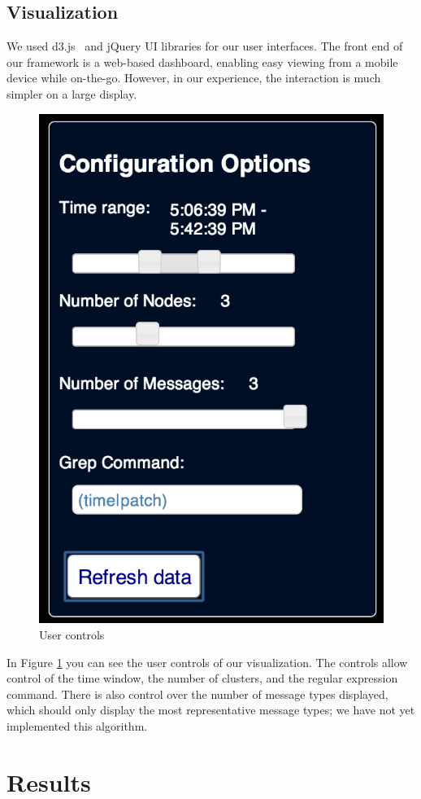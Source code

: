 \documentclass[conference]{style/acmsiggraph}
\begin{document}
\subsection{Visualization}

We used d3.js~\cite{D311} and jQuery UI libraries for our user interfaces.
The front end of our framework is a web-based dashboard, enabling easy viewing from a mobile device while on-the-go.
However, in our experience, the interaction is much simpler on a large display.

\begin{figure}[t]
    \centering
    \includegraphics[width=0.7\columnwidth]{images/screenshot_controls.png}
    \caption{User controls}
    \label{fig:ss_controls}
\end{figure}

In Figure \ref{fig:ss_controls} you can see the user controls of our visualization.
The controls allow control of the time window, the number of clusters, and the regular expression command.
There is also control over the number of message types displayed, which should only display the most representative message types;
we have not yet implemented this algorithm.

\section{Results}
\end{document}
